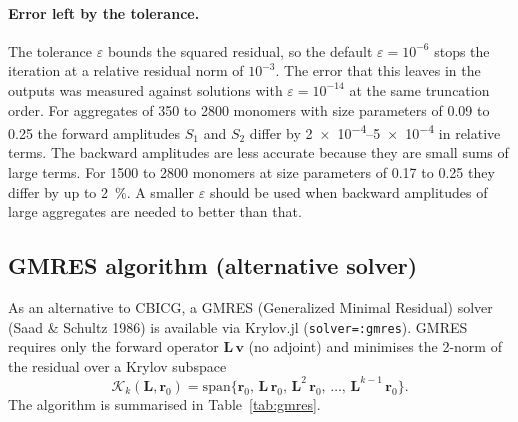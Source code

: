 \documentclass[11pt,a4paper]{article}
\begin{document}
\paragraph{Error left by the tolerance.}
\label{sec:cbicg-tolerance}
The tolerance $\varepsilon$ bounds the squared residual, so the default $\varepsilon = 10^{-6}$ stops the iteration at a relative residual norm of $10^{-3}$.
The error that this leaves in the outputs was measured against solutions with $\varepsilon = 10^{-14}$ at the same truncation order.
For aggregates of 350 to 2800 monomers with size parameters of 0.09 to 0.25 the forward amplitudes $S_1$ and $S_2$ differ by \numrange{2e-4}{5e-4} in relative terms.
The backward amplitudes are less accurate because they are small sums of large terms.
For 1500 to 2800 monomers at size parameters of 0.17 to 0.25 they differ by up to \SI{2}{\percent}.
A smaller $\varepsilon$ should be used when backward amplitudes of large aggregates are needed to better than that.

\subsection{GMRES algorithm (alternative solver)}

As an alternative to CBICG, a GMRES (Generalized Minimal Residual) solver (Saad \& Schultz 1986) is available via Krylov.jl (\texttt{solver=:gmres}).  GMRES requires only the forward operator $\mathbf{L}\,\bm{v}$ (no adjoint) and minimises the 2-norm of the residual over a Krylov subspace
\begin{equation}
  \mathcal{K}_k(\mathbf{L}, \bm{r}_0) = \mathrm{span}\{\bm{r}_0,\, \mathbf{L}\,\bm{r}_0,\, \mathbf{L}^2\,\bm{r}_0,\, \ldots,\, \mathbf{L}^{k-1}\,\bm{r}_0\}.
  \label{eq:krylov-subspace}
\end{equation}
The algorithm is summarised in Table~\ref{tab:gmres}.
\end{document}
